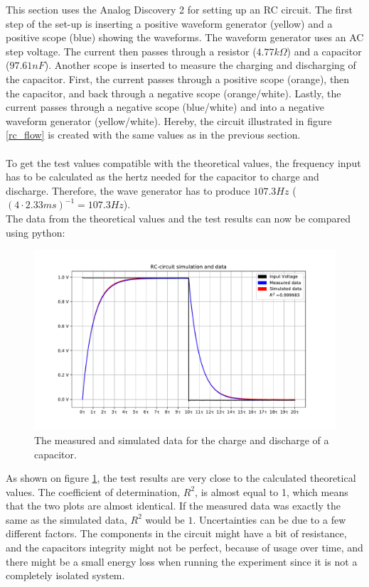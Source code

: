 This section uses the Analog Discovery 2 for setting up an RC circuit. The first step of the set-up is inserting a positive waveform generator (yellow) and a positive scope (blue) showing the waveforms. The waveform generator uses an AC step voltage. The current then passes through a resistor ($4.77 k\Omega$) and a capacitor ($97.61 nF$). Another scope is inserted to measure the charging and discharging of the capacitor. First, the current passes through a positive scope (orange), then the capacitor, and back through a negative scope (orange/white). Lastly, the current passes through a negative scope (blue/white) and into a negative waveform generator (yellow/white). Hereby, the circuit illustrated in figure \ref{rc_flow} is created with the same values as in the previous section. \\ \\
To get the test values compatible with the theoretical values, the frequency input has to be calculated as the hertz needed for the capacitor to charge and discharge. Therefore, the wave generator has to produce $107.3 Hz$  ($(4 \cdot 2.33 ms)^{-1} = 107.3 Hz$). \\
The data from the theoretical values and the test results can now be compared using python:
\begin{figure}[H]
\center
\includegraphics[scale=0.6]{fig/img/eks_1}
\caption{The measured and simulated data for the charge and discharge of a capacitor.}
\label{fig:Cap}
\end{figure}
\noindent
As shown on figure \ref{fig:Cap}, the test results are very close to the calculated theoretical values. The coefficient of determination, $R^2$, is almost equal to 1, which means that the two plots are almost identical. If the measured data was exactly the same as the simulated data, $R^2$ would be $1$. Uncertainties can be due to a few different factors. The components in the circuit might have a bit of resistance, and the capacitors integrity might not be perfect, because of usage over time, and there might be a small energy loss when running the experiment since it is not a completely isolated system. 